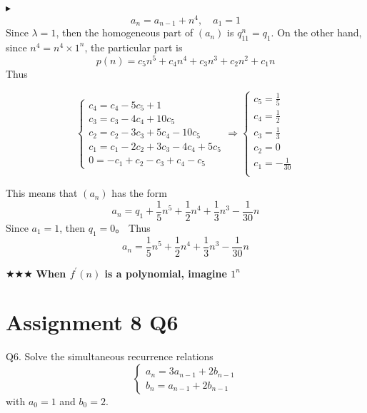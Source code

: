 $\blacktriangleright$ $$a_n=a_{n-1}+n^4,\quad a_1=1$$
Since $\lambda=1$, then the homogeneous part of $(a_n)$ is $q_11^n=q_1$.
On the other hand, since $n^4=n^4\times1^n$, the particular part is $$p(n)=c_5n^5+c_4n^4+c_3n^3+c_2n^2+c_1n$$ Thus

\begin{equation*}
    \begin{cases}
        c_4=c_4-5c_5+1\\
        c_3=c_3-4c_4+10c_5\\
        c_2=c_2-3c_3+5c_4-10c_5\\
        c_1=c_1-2c_2+3c_3-4c_4+5c_5\\
        0=-c_1+c_2-c_3+c_4-c_5
    \end{cases}
    \Rightarrow
    \begin{cases}
        c_5=\frac{1}{5}\\
        c_4=\frac{1}{2}\\
        c_3=\frac{1}{3}\\
        c_2=0\\
        c_1=-\frac{1}{30}\\
    \end{cases}
\end{equation*}

This means that $(a_n)$ has the form $$a_n=q_1+\frac{1}{5}n^5+\frac{1}{2}n^4+\frac{1}{3}n^3-\frac{1}{30}n$$
Since $a_1=1$, then $q_1=0$。
Thus $$a_n=\frac{1}{5}n^5+\frac{1}{2}n^4+\frac{1}{3}n^3-\frac{1}{30}n$$

$\bigstar\bigstar\bigstar$ \textbf{When $f^\prime(n)$ is a polynomial, imagine $1^n$}

\section*{Assignment 8 Q6}
Q6. Solve the simultaneous recurrence relations
\begin{equation*}
    \begin{cases}
        a_n=3a_{n-1}+2b_{n-1}\\
        b_n=a_{n-1}+2b_{n-1}
    \end{cases}
\end{equation*}
with $a_0 = 1$ and $b_0 = 2$.

